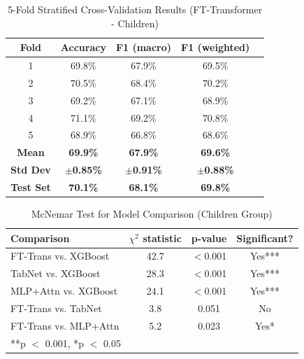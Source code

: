 \documentclass{article}
\begin{document}

\begin{table}[ht]
\centering
\caption{5-Fold Stratified Cross-Validation Results (FT-Transformer - Children)}
\label{tab:crossval}
\begin{tabular}{ccccc}
\toprule
\textbf{Fold} & \textbf{Accuracy} & \textbf{F1 (macro)} & \textbf{F1 (weighted)} \\
\midrule
1 & 69.8\% & 67.9\% & 69.5\% \\
2 & 70.5\% & 68.4\% & 70.2\% \\
3 & 69.2\% & 67.1\% & 68.9\% \\
4 & 71.1\% & 69.2\% & 70.8\% \\
5 & 68.9\% & 66.8\% & 68.6\% \\
\midrule
\textbf{Mean}   & \textbf{69.9\%} & \textbf{67.9\%} & \textbf{69.6\%} \\
\textbf{Std Dev} & \textbf{$\pm$0.85\%} & \textbf{$\pm$0.91\%} & \textbf{$\pm$0.88\%} \\
\midrule
\textbf{Test Set} & \textbf{70.1\%} & \textbf{68.1\%} & \textbf{69.8\%} \\
\bottomrule
\end{tabular}
\end{table}


\begin{table}[ht]
\centering
\caption{McNemar Test for Model Comparison (Children Group)}
\label{tab:mcnemar}
\begin{tabular}{lccc}
\toprule
\textbf{Comparison} & \textbf{$\chi^2$ statistic} & \textbf{p-value} & \textbf{Significant?} \\
\midrule
FT-Trans vs. XGBoost    & 42.7 & $<$0.001 & Yes*** \\
TabNet vs. XGBoost      & 28.3 & $<$0.001 & Yes*** \\
MLP+Attn vs. XGBoost    & 24.1 & $<$0.001 & Yes*** \\
FT-Trans vs. TabNet     & 3.8  & 0.051    & No \\
FT-Trans vs. MLP+Attn   & 5.2  & 0.023    & Yes* \\
\midrule
\multicolumn{4}{l}{\footnotesize ***p $<$ 0.001, *p $<$ 0.05} \\
\bottomrule
\end{tabular}
\end{table}
\end{document}
